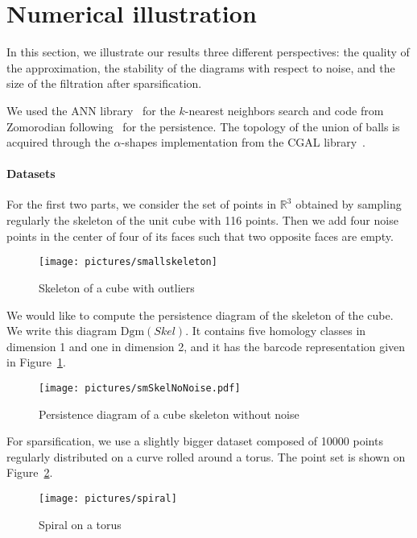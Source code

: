 \documentclass[a4paper]{article}
\newcommand\R{\mathbb{R}}
\newcommand\Dgm[1]{\mathrm{Dgm}(#1)}
\begin{document}
%
 

\section{Numerical illustration} \label{sNumeric}


In this section, we illustrate our results three different perspectives:
the quality of the approximation,
the stability of the diagrams with respect to noise, and
the size of the filtration after sparsification.

We used the ANN library~\cite{annMS} for the $k$-nearest neighbors search and code from Zomorodian following~\cite{cphCZ} for the persistence.
The topology of the union of balls is acquired through the $\alpha$-shapes implementation from the CGAL library~\cite{cgalAlphaShapes3D}.

\paragraph{Datasets\\}
For the first two parts, we consider the set of points in $\R^3$ obtained by sampling regularly the skeleton of the unit cube with 116 points.
Then we add four noise points in the center of four of its faces such that two opposite faces are empty.

\begin{figure}[!ht]
\centering
\texttt{[image: pictures/smallskeleton]}
\caption{Skeleton of a cube with outliers}
\end{figure}

We would like to compute the persistence diagram of the skeleton of the cube. 
We write this diagram $\Dgm{Skel}$.
It contains five homology classes in dimension 1 and one in dimension 2, and it has the barcode representation given in Figure~\ref{fDgmSkel}.

\begin{figure}[!ht]
\centering
\texttt{[image: pictures/smSkelNoNoise.pdf]}
\caption{Persistence diagram of a cube skeleton without noise}\label{fDgmSkel}
\end{figure}

For sparsification, we use a slightly bigger dataset composed of 10000 points regularly distributed on a curve rolled around a torus.
The point set is shown on Figure~\ref{fSpiral}.

\begin{figure}[!ht]
\centering
\texttt{[image: pictures/spiral]}
\caption{Spiral on a torus}\label{fSpiral}
\end{figure}
\end{document}
